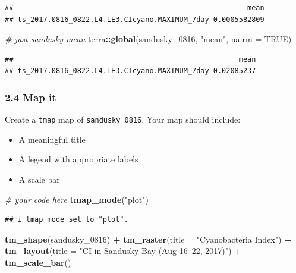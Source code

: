 \documentclass[
]{article}
\newenvironment{Shaded}{\begin{snugshade}}{\end{snugshade}}
\newcommand{\AttributeTok}[1]{\textcolor[rgb]{0.13,0.29,0.53}{#1}}
\newcommand{\CommentTok}[1]{\textcolor[rgb]{0.56,0.35,0.01}{\textit{#1}}}
\newcommand{\ConstantTok}[1]{\textcolor[rgb]{0.56,0.35,0.01}{#1}}
\newcommand{\FunctionTok}[1]{\textcolor[rgb]{0.13,0.29,0.53}{\textbf{#1}}}
\newcommand{\NormalTok}[1]{#1}
\newcommand{\SpecialCharTok}[1]{\textcolor[rgb]{0.81,0.36,0.00}{\textbf{#1}}}
\newcommand{\StringTok}[1]{\textcolor[rgb]{0.31,0.60,0.02}{#1}}
\providecommand{\tightlist}{%
  \setlength{\itemsep}{0pt}\setlength{\parskip}{0pt}}
\begin{document}
\begin{verbatim}
##                                                       mean
## ts_2017.0816_0822.L4.LE3.CIcyano.MAXIMUM_7day 0.0005582809
\end{verbatim}

\begin{Shaded}
\begin{Highlighting}[]
\CommentTok{\# just sandusky mean}
\NormalTok{terra}\SpecialCharTok{::}\FunctionTok{global}\NormalTok{(sandusky\_0816, }\StringTok{"mean"}\NormalTok{, }\AttributeTok{na.rm =} \ConstantTok{TRUE}\NormalTok{)}
\end{Highlighting}
\end{Shaded}

\begin{verbatim}
##                                                     mean
## ts_2017.0816_0822.L4.LE3.CIcyano.MAXIMUM_7day 0.02085237
\end{verbatim}

\hypertarget{map-it}{%
\subsubsection{2.4 Map it}\label{map-it}}

Create a \texttt{tmap} map of \texttt{sandusky\_0816}. Your map should
include:

\begin{itemize}
\tightlist
\item
  A meaningful title
\item
  A legend with appropriate labels
\item
  A scale bar
\end{itemize}

\begin{Shaded}
\begin{Highlighting}[]
\CommentTok{\# your code here}
\FunctionTok{tmap\_mode}\NormalTok{(}\StringTok{"plot"}\NormalTok{)}
\end{Highlighting}
\end{Shaded}

\begin{verbatim}
## i tmap mode set to "plot".
\end{verbatim}

\begin{Shaded}
\begin{Highlighting}[]
\FunctionTok{tm\_shape}\NormalTok{(sandusky\_0816) }\SpecialCharTok{+}
  \FunctionTok{tm\_raster}\NormalTok{(}\AttributeTok{title =} \StringTok{"Cyanobacteria Index"}\NormalTok{) }\SpecialCharTok{+}
  \FunctionTok{tm\_layout}\NormalTok{(}\AttributeTok{title =} \StringTok{"CI in Sandusky Bay (Aug 16–22, 2017)"}\NormalTok{) }\SpecialCharTok{+}
  \FunctionTok{tm\_scale\_bar}\NormalTok{()}
\end{Highlighting}
\end{Shaded}
\end{document}
